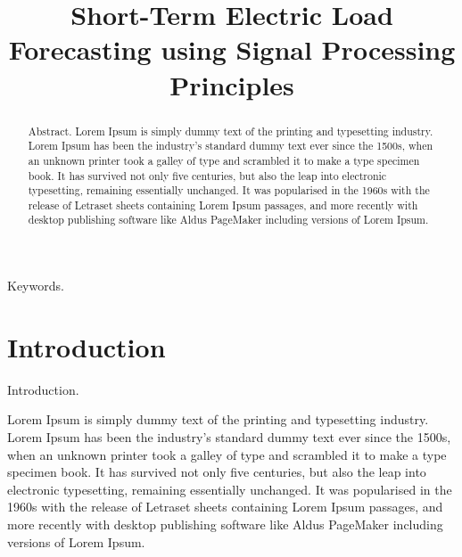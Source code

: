 \documentclass[conference]{IEEEtran}
\begin{document}
\title{Short-Term Electric Load Forecasting using Signal Processing Principles}

\author{
\and
{}
}

\maketitle

\begin{abstract}
Abstract.
Lorem Ipsum is simply dummy text of the printing and typesetting industry. Lorem Ipsum has been the industry's standard dummy text ever since the 1500s, when an unknown printer took a galley of type and scrambled it to make a type specimen book. It has survived not only five centuries, but also the leap into electronic typesetting, remaining essentially unchanged. It was popularised in the 1960s with the release of Letraset sheets containing Lorem Ipsum passages, and more recently with desktop publishing software like Aldus PageMaker including versions of Lorem Ipsum.
\end{abstract}

\begin{IEEEkeywords}
Keywords.
\end{IEEEkeywords}

\section{Introduction}
Introduction.

Lorem Ipsum is simply dummy text of the printing and typesetting industry. Lorem Ipsum has been the industry's standard dummy text ever since the 1500s, when an unknown printer took a galley of type and scrambled it to make a type specimen book. It has survived not only five centuries, but also the leap into electronic typesetting, remaining essentially unchanged. It was popularised in the 1960s with the release of Letraset sheets containing Lorem Ipsum passages, and more recently with desktop publishing software like Aldus PageMaker including versions of Lorem Ipsum.
\end{document}
